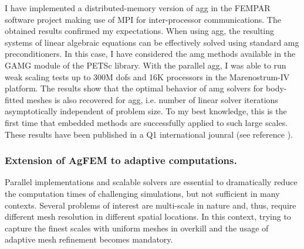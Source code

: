 \documentclass{article}
\begin{document}
I have implemented a distributed-memory version of \ac{agg} in the FEMPAR software project  making use of MPI for inter-processor communications. The obtained results confirmed my expectations. When using \ac{agg}, the resulting systems of linear algebraic equations can be effectively solved using standard \ac{amg} preconditioners. In this case, I have considered the \ac{amg} methods available in the GAMG module of the PETSc library. {{With the parallel \ac{agg}, I was able to run  weak scaling tests up to  300M \acp{dof} and 16K processors in the Marenostrum-IV platform}}. The results show that the optimal behavior of \ac{amg} solvers for body-fitted meshes is also recovered for \ac{agg}, i.e. number of linear solver iterations asymptotically independent of problem size. To my best knowledge, this is the first time that embedded methods are successfully applied to such large scales. These results have been published in a { Q1 international jounral} (see reference \cite{verdugo_2019}).

\subsubsection{Extension of AgFEM to adaptive computations.}


Parallel implementations and scalable solvers are essential to dramatically reduce the computation times of challenging simulations, but not sufficient in many contexts. Several problems of interest are multi-scale in nature and, thus, require different mesh resolution in different spatial locations. In this context, trying to capture the finest scales with uniform meshes in overkill and the usage of adaptive mesh refinement becomes mandatory.
\end{document}

